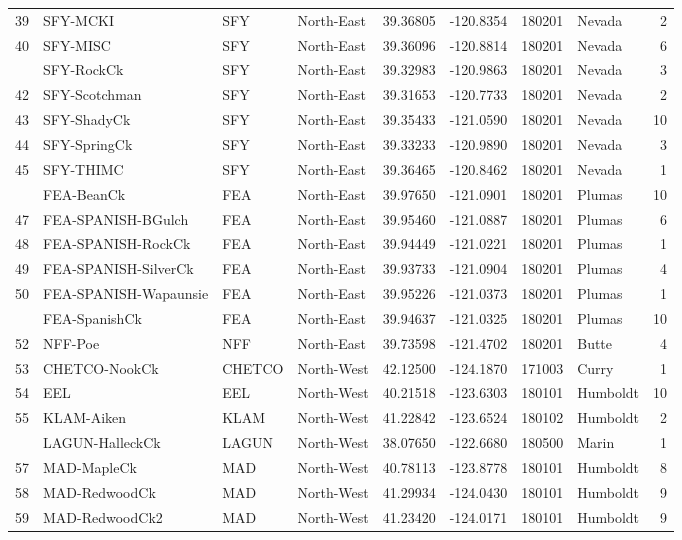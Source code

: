 \documentclass[proquest,12pt,final]{ucthesis-CA2012} %
\begin{document}
\begin{ucmainmatter}
\begin{longtable}[t]{rlllrrrlr}
39 & SFY-MCKI & SFY & North-East & 39.36805 & -120.8354 & 180201 & Nevada & 2\\
40 & SFY-MISC & SFY & North-East & 39.36096 & -120.8814 & 180201 & Nevada & 6\\
\addlinespace
41 & SFY-RockCk & SFY & North-East & 39.32983 & -120.9863 & 180201 & Nevada & 3\\
42 & SFY-Scotchman & SFY & North-East & 39.31653 & -120.7733 & 180201 & Nevada & 2\\
43 & SFY-ShadyCk & SFY & North-East & 39.35433 & -121.0590 & 180201 & Nevada & 10\\
44 & SFY-SpringCk & SFY & North-East & 39.33233 & -120.9890 & 180201 & Nevada & 3\\
45 & SFY-THIMC & SFY & North-East & 39.36465 & -120.8462 & 180201 & Nevada & 1\\
\addlinespace
46 & FEA-BeanCk & FEA & North-East & 39.97650 & -121.0901 & 180201 & Plumas & 10\\
47 & FEA-SPANISH-BGulch & FEA & North-East & 39.95460 & -121.0887 & 180201 & Plumas & 6\\
48 & FEA-SPANISH-RockCk & FEA & North-East & 39.94449 & -121.0221 & 180201 & Plumas & 1\\
49 & FEA-SPANISH-SilverCk & FEA & North-East & 39.93733 & -121.0904 & 180201 & Plumas & 4\\
50 & FEA-SPANISH-Wapaunsie & FEA & North-East & 39.95226 & -121.0373 & 180201 & Plumas & 1\\
\addlinespace
51 & FEA-SpanishCk & FEA & North-East & 39.94637 & -121.0325 & 180201 & Plumas & 10\\
52 & NFF-Poe & NFF & North-East & 39.73598 & -121.4702 & 180201 & Butte & 4\\
53 & CHETCO-NookCk & CHETCO & North-West & 42.12500 & -124.1870 & 171003 & Curry & 1\\
54 & EEL & EEL & North-West & 40.21518 & -123.6303 & 180101 & Humboldt & 10\\
55 & KLAM-Aiken & KLAM & North-West & 41.22842 & -123.6524 & 180102 & Humboldt & 2\\
\addlinespace
56 & LAGUN-HalleckCk & LAGUN & North-West & 38.07650 & -122.6680 & 180500 & Marin & 1\\
57 & MAD-MapleCk & MAD & North-West & 40.78113 & -123.8778 & 180101 & Humboldt & 8\\
58 & MAD-RedwoodCk & MAD & North-West & 41.29934 & -124.0430 & 180101 & Humboldt & 9\\
59 & MAD-RedwoodCk2 & MAD & North-West & 41.23420 & -124.0171 & 180101 & Humboldt & 9\\

\end{longtable}
\end{ucmainmatter}
\end{document}
